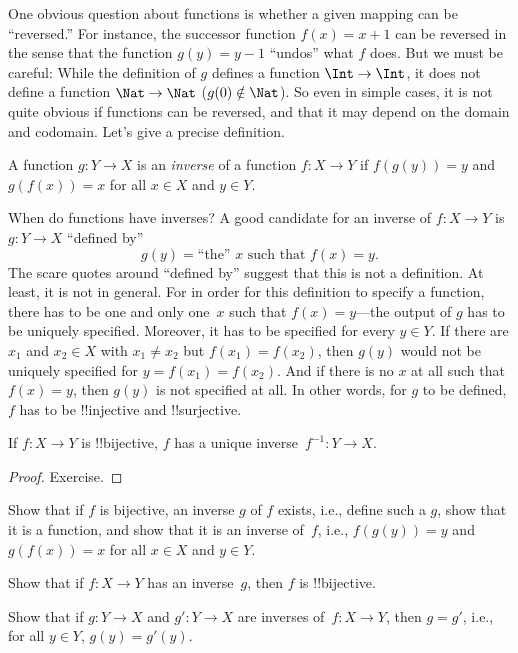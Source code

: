 \documentclass[../../../include/open-logic-section]{subfiles}
\begin{document}

\begin{explain}
One obvious question about functions is whether a given mapping can be
``reversed.'' For instance, the successor function $f(x) = x + 1$ can
be reversed in the sense that the function $g(y) = y - 1$ ``undos''
what $f$ does. But we must be careful: While the definition of $g$
defines a function $\Int \to \Int$, it does not define a function
$\Nat \to \Nat$ ($g(0) \notin \Nat$).  So even in simple cases, it is
not quite obvious if functions can be reversed, and that it may depend
on the domain and codomain.  Let's give a precise definition.
\end{explain}

\begin{defn}
A function $g \colon Y \to X$ is an \emph{inverse} of a function $f
\colon X \to Y$ if $f(g(y)) = y$ and $g(f(x)) = x$ for all $x \in X$
and $y \in Y$.
\end{defn}

\begin{explain}
When do functions have inverses?  A good candidate for an inverse of
$f\colon X \to Y$ is $g\colon Y \to X$ ``defined by''
\[
g(y) = \text{``the'' $x$ such that $f(x) = y$.}
\]
The scare quotes around ``defined by'' suggest that this is not a
definition.  At least, it is not in general.  For in order for this
definition to specify a function, there has to be one and only one~$x$
such that $f(x) = y$---the output of $g$ has to be uniquely specified.
Moreover, it has to be specified for every $y \in Y$.  If there are
$x_1$ and $x_2 \in X$ with $x_1 \neq x_2$ but $f(x_1) = f(x_2)$, then
$g(y)$ would not be uniquely specified for $y = f(x_1) = f(x_2)$. And
if there is no $x$ at all such that $f(x) = y$, then $g(y)$ is not
specified at all.  In other words, for $g$ to be defined, $f$ has to
be !!{injective} and !!{surjective}.
\end{explain}

\begin{prop}
If $f\colon X \to Y$ is !!{bijective}, $f$ has a unique
inverse~$f^{-1}\colon Y \to X$.
\end{prop}

\begin{proof}
Exercise.
\end{proof}

\begin{prob}
Show that if $f$ is bijective, an inverse $g$ of $f$ exists, i.e.,
define such a $g$, show that it is a function, and show that it is an
inverse of~$f$, i.e., $f(g(y)) = y$ and $g(f(x)) = x$ for all $x \in
X$ and $y \in Y$.
\end{prob}

\begin{prob}
Show that if $f\colon X \to Y$ has an inverse~$g$, then $f$ is
!!{bijective}.
\end{prob}

\begin{prob}
Show that if $g\colon Y \to X$ and $g'\colon Y \to X$ are inverses
of~$f\colon X \to Y$, then $g = g'$, i.e., for all $y \in Y$, $g(y) =
g'(y)$.
\end{prob}
\end{document}

